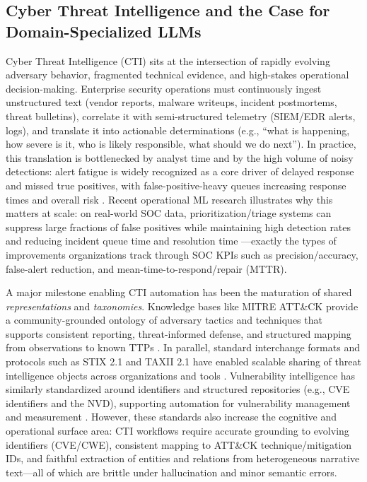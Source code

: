 
\subsection{Cyber Threat Intelligence and the Case for Domain-Specialized LLMs}
Cyber Threat Intelligence (CTI) sits at the intersection of rapidly evolving adversary behavior, fragmented technical evidence, and high-stakes operational decision-making. Enterprise security operations must continuously ingest unstructured text (vendor reports, malware writeups, incident postmortems, threat bulletins), correlate it with semi-structured telemetry (SIEM/EDR alerts, logs), and translate it into actionable determinations (e.g., ``what is happening, how severe is it, who is likely responsible, what should we do next''). In practice, this translation is bottlenecked by analyst time and by the high volume of noisy detections: alert fatigue is widely recognized as a core driver of delayed response and missed true positives, with false-positive-heavy queues increasing response times and overall risk \cite{ban2021combat,gelman2023teq}. Recent operational ML research illustrates why this matters at scale: on real-world SOC data, prioritization/triage systems can suppress large fractions of false positives while maintaining high detection rates and reducing incident queue time and resolution time \cite{gelman2023teq}---exactly the types of improvements organizations track through SOC KPIs such as precision/accuracy, false-alert reduction, and mean-time-to-respond/repair (MTTR).

A major milestone enabling CTI automation has been the maturation of shared \emph{representations} and \emph{taxonomies}. Knowledge bases like MITRE ATT\&CK provide a community-grounded ontology of adversary tactics and techniques that supports consistent reporting, threat-informed defense, and structured mapping from observations to known TTPs \cite{strom2020attack}. In parallel, standard interchange formats and protocols such as STIX 2.1 and TAXII 2.1 have enabled scalable sharing of threat intelligence objects across organizations and tools \cite{oasis2021stix,oasis2021taxii}. Vulnerability intelligence has similarly standardized around identifiers and structured repositories (e.g., CVE identifiers and the NVD), supporting automation for vulnerability management and measurement \cite{cve2026cve,nist2026nvd}. However, these standards also increase the cognitive and operational surface area: CTI workflows require accurate grounding to evolving identifiers (CVE/CWE), consistent mapping to ATT\&CK technique/mitigation IDs, and faithful extraction of entities and relations from heterogeneous narrative text---all of which are brittle under hallucination and minor semantic errors.

